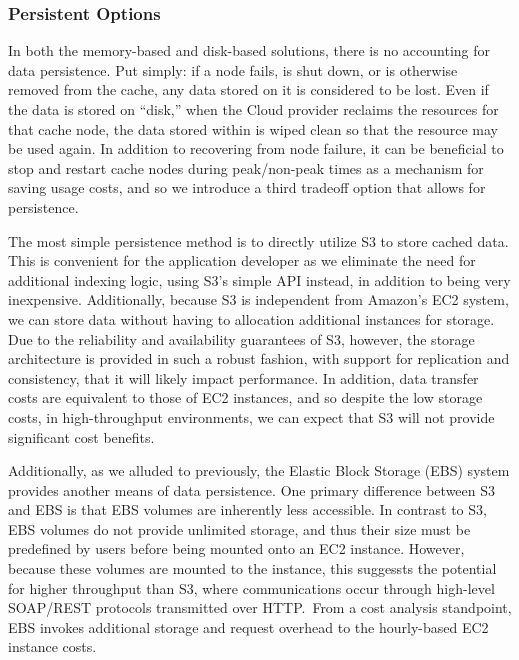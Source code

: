 \subsubsection{Persistent Options} %
\label{subsub:persistent_options}
In both the memory-based and disk-based solutions, there is no accounting for
data persistence. Put simply: if a node fails, is shut down, or is otherwise
removed from the cache, any data stored on it is considered to be lost. Even if
the data is stored on ``disk,'' when the Cloud provider reclaims the resources
for that cache node, the data stored within is wiped clean so that the resource
may be used again. In addition to recovering from node failure, it can be
beneficial to stop and restart cache nodes during peak/non-peak times as a
mechanism for saving usage costs, and so we introduce a third tradeoff option
that allows for persistence.

The most simple persistence method is to directly utilize S3 to store cached
data. This is convenient for the application developer as we eliminate the
need for additional indexing logic, using S3's simple API instead, in addition
to being very inexpensive. Additionally, because S3 is independent from
Amazon's EC2 system, we can store data without having to allocation additional
instances for storage. Due to the reliability and availability guarantees of
S3, however, the storage architecture is provided in such a robust fashion,
with support for replication and consistency, that it will likely impact
performance. In addition, data transfer costs are equivalent to those of EC2
instances, and so despite the low storage costs, in high-throughput
environments, we can expect that S3 will not provide significant cost benefits.

Additionally, as we alluded to previously, the Elastic Block Storage (EBS)
system provides another means of data persistence. One primary difference
between S3 and EBS is that EBS volumes are inherently less accessible. In
contrast to S3, EBS volumes do not provide unlimited storage, and thus their
size must be predefined by users before being mounted onto an EC2 instance.
However, because these volumes are mounted to the instance, this suggessts the
potential for higher throughput than S3, where communications occur through
high-level SOAP/REST protocols transmitted over HTTP.\ From a cost analysis
standpoint, EBS invokes additional storage and request overhead to the
hourly-based EC2 instance costs.


